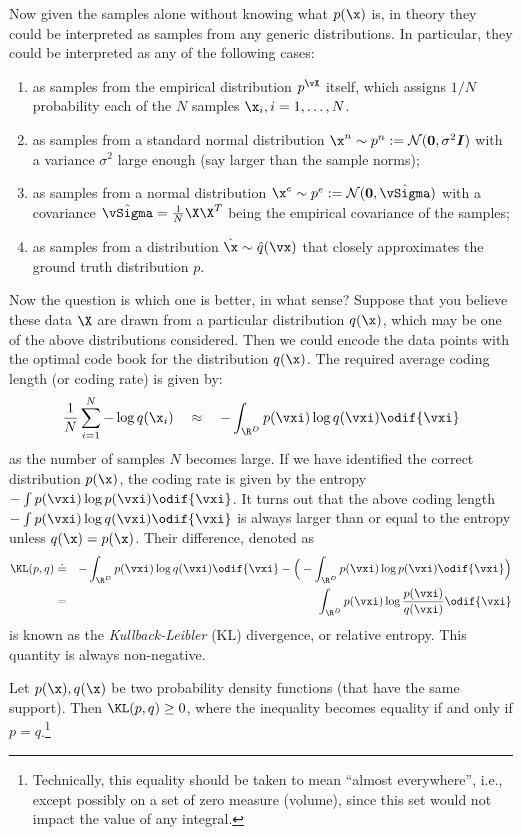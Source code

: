 \documentclass[../../book-main.tex]{subfiles}
\begin{document}
Now given the samples alone without knowing what $p(\x)$ is, in theory they could be interpreted as samples from any generic distributions. In particular, they could be interpreted as any of the following cases:
\begin{enumerate}
	\item as samples from the empirical distribution $p^{\vX}$ itself, which assigns $1/N$ probability each of the $N$ samples $\x_i, i=1, \ldots, N$.
	\item as samples from a standard normal distribution $\x^n \sim p^{n} := \mathcal{N}(\boldsymbol{0}, \sigma^2 \boldsymbol{I})$ with a variance $\sigma^2$ large enough (say larger than the sample norms);
	\item as samples from a normal distribution $\x^e \sim p^{e} := \mathcal{N}(\boldsymbol{0}, \hat{\vSigma})$ with a covariance $\hat{\vSigma} = \frac{1}{N} \X \X^T$ being the empirical covariance of the samples;
	\item as samples from a distribution $\hat \x \sim \hat{q}(\vx)$ that closely approximates the ground truth  distribution $p$.
\end{enumerate}
Now the question is which one is better, in what sense? Suppose that you believe these data $\X$ are drawn from a particular distribution  $q(\x)$, which may be one of the above distributions considered. Then we could encode the data points with the optimal code book for the distribution $q(\x)$. The required average coding length (or coding rate) is given by:
\begin{equation}
	\frac{1}{N}\sum_{i=1}^N -\log q(\x_i) \quad \approx \quad - \int_{\R^{D}} p(\vxi) \log q(\vxi)\odif{\vxi}
\end{equation}
as the number of samples $N$ becomes large. If we have identified the correct distribution $p(\x)$, the coding rate is given by the entropy $- \int p(\vxi) \log p(\vxi) \odif{\vxi}$. It turns out that the above coding length $- \int p(\vxi) \log q(\vxi) \odif{\vxi}$ is always larger than or equal to the entropy unless $q(\x) = p(\x)$. Their difference, denoted as
\begin{eqnarray}
	\KL(p, q) &\doteq& - \int_{\R^{D}} p(\vxi) \log q(\vxi) \odif{\vxi}  - \Big(- \int_{\R^{D}} p(\vxi) \log p(\vxi) \odif{\vxi} \Big)\\
	&=& \int_{\R^{D}} p(\vxi) \log \frac{p(\vxi)}{q(\vxi)} \odif{\vxi}
\end{eqnarray}
is known as the {\em Kullback-Leibler} (KL) divergence, or relative entropy. This quantity is always non-negative.
\begin{theorem}\label{thm:information-inequality}
	Let $p(\x), q(\x)$ be two probability density functions (that have the same support). Then $\KL(p, q) \ge 0$, where the inequality becomes equality if and only if $p = q$.\footnote{Technically, this equality should be taken to mean ``almost everywhere'', i.e., except possibly on a set of zero measure (volume), since this set would not impact the value of any integral.}
\end{theorem}
\end{document}
